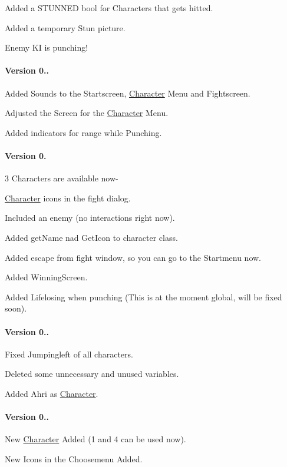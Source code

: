 Added a S\+T\+U\+N\+N\+E\+D bool for Characters that gets hitted.

Added a temporary Stun picture.

Enemy K\+I is punching!

\paragraph*{Version 0..}

Added Sounds to the Startscreen, \hyperlink{class_character}{Character} Menu and Fightscreen.

Adjusted the Screen for the \hyperlink{class_character}{Character} Menu.

Added indicators for range while Punching.

\paragraph*{Version 0.}

3 Characters are available now-\/

\hyperlink{class_character}{Character} icons in the fight dialog.

Included an enemy (no interactions right now).

Added get\+Name nad Get\+Icon to character class.

Added escape from fight window, so you can go to the Startmenu now.

Added Winning\+Screen.

Added Lifelosing when punching (This is at the moment global, will be fixed soon).

\paragraph*{Version 0..}

Fixed Jumpingleft of all characters.

Deleted some unnecessary and unused variables.

Added Ahri as \hyperlink{class_character}{Character}.

\paragraph*{Version 0..}

New \hyperlink{class_character}{Character} Added (1 and 4 can be used now).

New Icons in the Choosemenu Added.

